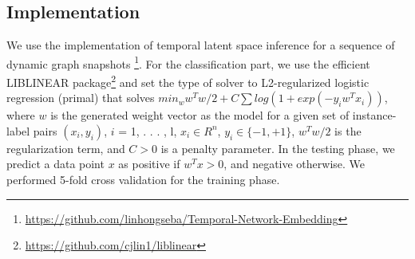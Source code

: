 \subsection{Implementation}

We use the implementation of temporal latent space inference for a sequence of dynamic graph snapshots \footnote{\url{https://github.com/linhongseba/Temporal-Network-Embedding}}\cite{Zhu2016}.
 For the classification part, we use the efficient LIBLINEAR \cite{fan2008liblinear} package\footnote{\url{https://github.com/cjlin1/liblinear}} and set the type of solver to L2-regularized logistic regression (primal) that solves $min_w w^Tw/2 + C \sum log(1 + exp(-y_i w^Tx_i))$, where $w$ is the generated weight vector as the model for a given set of instance-label pairs $(x_i, y_i)$, $i$ = 1, . . . , l, $x_i \in R^n$, $y_i \in \{-1, +1\}$,  $w^Tw/2$ is the regularization term, and $C > 0$ is a penalty parameter. In the testing phase, we predict a data point $x$ as positive if $w^Tx > 0$, and negative otherwise. We performed 5-fold cross validation for the training phase.












